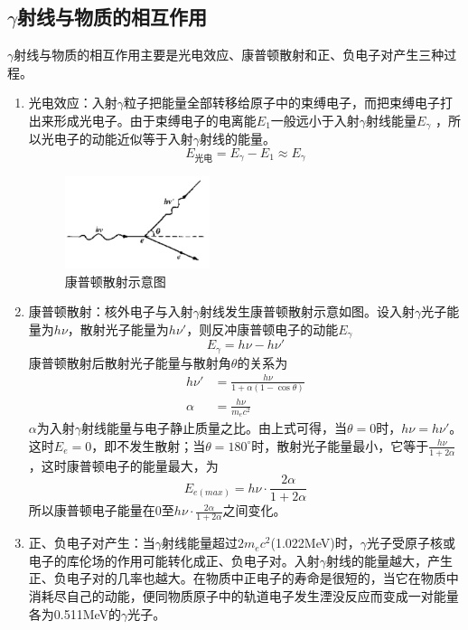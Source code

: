 \documentclass[a4paper]{article}
\begin{document}
\subsection{$ \gamma $射线与物质的相互作用}
$ \gamma $射线与物质的相互作用主要是光电效应、康普顿散射和正、负电子对产生三种过程。
\begin{enumerate}
	\item 光电效应：入射$\gamma$粒子把能量全部转移给原子中的束缚电子，而把束缚电子打出来形成光电子。由于束缚电子的电离能$E_1$一般远小于入射$\gamma$射线能量$E_{\gamma}$ ，所以光电子的动能近似等于入射$\gamma$射线的能量。
	      \begin{equation}
		      E_{\text{光电}} = E_{\gamma} - E_1 \approx E_{\gamma}
	      \end{equation}
	      \begin{figure}[!h]
		      \centering
		      \includegraphics[width=0.4\textwidth]{fig/fig1.pdf}
		      \caption{康普顿散射示意图}\label{fig1}
	      \end{figure}

	\item 康普顿散射：核外电子与入射$\gamma$射线发生康普顿散射示意如图。设入射$\gamma$光子能量为$h\nu$，散射光子能量为$h\nu'$，则反冲康普顿电子的动能$E_{\gamma}$
	      \begin{equation}
		      E_{\gamma} = h\nu - h\nu'
	      \end{equation}
	      康普顿散射后散射光子能量与散射角$\theta$的关系为
	      \begin{align}
		      h\nu' &= \frac{h\nu}{1+\alpha(1-\cos\theta)}\label{eq1}\\
		      \alpha &= \frac{h\nu}{m_ec^2}
	      \end{align}
	      $\alpha$为入射$\gamma$射线能量与电子静止质量之比。由上式可得，当$\theta=0$时，$h\nu =h\nu'$。这时$E_e=0$，即不发生散射；当$\theta=180^{\circ}$时，散射光子能量最小，它等于$\frac{h\nu}{1+2\alpha}$，这时康普顿电子的能量最大，为
	      \begin{equation}
		      E_{e(max)} = h\nu\cdot\frac{2\alpha}{1+2\alpha}\label{eq2}
	      \end{equation}
	      所以康普顿电子能量在0至$h\nu\cdot\frac{2\alpha}{1+2\alpha}$之间变化。
	\item 正、负电子对产生：当$\gamma$射线能量超过$2m_ec^2$(1.022MeV)时，$\gamma$光子受原子核或电子的库伦场的作用可能转化成正、负电子对。入射$\gamma$射线的能量越大，产生正、负电子对的几率也越大。在物质中正电子的寿命是很短的，当它在物质中消耗尽自己的动能，便同物质原子中的轨道电子发生湮没反应而变成一对能量各为0.511MeV的$\gamma$光子。
\end{enumerate}
\end{document}
